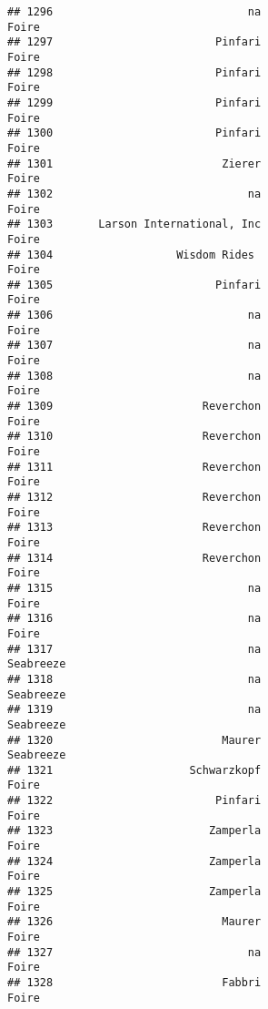 \documentclass[
]{article}
\begin{document}
\begin{verbatim}
## 1296                              na                                   Foire
## 1297                         Pinfari                                   Foire
## 1298                         Pinfari                                   Foire
## 1299                         Pinfari                                   Foire
## 1300                         Pinfari                                   Foire
## 1301                          Zierer                                   Foire
## 1302                              na                                   Foire
## 1303       Larson International, Inc                                   Foire
## 1304                   Wisdom Rides                                    Foire
## 1305                         Pinfari                                   Foire
## 1306                              na                                   Foire
## 1307                              na                                   Foire
## 1308                              na                                   Foire
## 1309                       Reverchon                                   Foire
## 1310                       Reverchon                                   Foire
## 1311                       Reverchon                                   Foire
## 1312                       Reverchon                                   Foire
## 1313                       Reverchon                                   Foire
## 1314                       Reverchon                                   Foire
## 1315                              na                                   Foire
## 1316                              na                                   Foire
## 1317                              na                               Seabreeze
## 1318                              na                               Seabreeze
## 1319                              na                               Seabreeze
## 1320                          Maurer                               Seabreeze
## 1321                     Schwarzkopf                                   Foire
## 1322                         Pinfari                                   Foire
## 1323                        Zamperla                                   Foire
## 1324                        Zamperla                                   Foire
## 1325                        Zamperla                                   Foire
## 1326                          Maurer                                   Foire
## 1327                              na                                   Foire
## 1328                          Fabbri                                   Foire

\end{verbatim}
\end{document}
